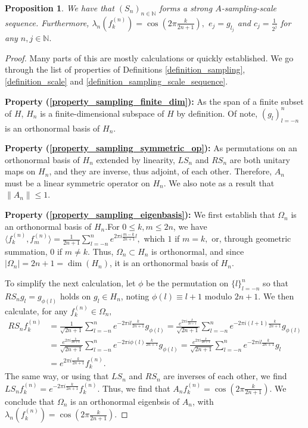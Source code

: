 \documentclass[10pt,a4paper]{amsart}
\newtheorem{prop}[thm]{Proposition}
\def \LL{\langle}
\def \RR{\rangle}
\begin{document}
\begin{prop}\label{proposition_shift_sampling_sequence}
	We have that $(S_n)_{n\in\mathbb{N}}$ forms a strong $A$-sampling-scale sequence. Furthermore, $\lambda_n(f_k^{(n)})=\cos\left(2\pi\frac{k}{2n+1} \right),$ $e_j=g_{l_j}$ and $c_j=\frac{1}{2^j}$ for any $n, j\in\mathbb{N}.$
\end{prop}
\begin{proof}
	Many parts of this are mostly calculations or quickly established. We go through the list of properties of Definitions \ref{definition_sampling}, \ref{definition_scale} and \ref{definition_sampling_scale_sequence}.
	
	\textbf{Property (\ref{property_sampling_finite_dim}):} As the span of a finite subset of $H$, $H_n$ is a finite-dimensional subspace of $H$ by definition. Of note, $(g_l)_{l=-n}^n$ is an orthonormal basis of $H_n$.
	
	\textbf{Property (\ref{property_sampling_symmetric_op}):} As permutations on an orthonormal basis of $H_n$ extended by linearity, $LS_n$ and $RS_n$ are both unitary maps on $H_n$, and they are inverse, thus adjoint, of each other. Therefore, $A_n$ must be a linear symmetric operator on $H_n.$ We also note as a result that $\|A_n\|\leq 1.$
	
	\textbf{Property (\ref{property_sampling_eigenbasis}):} We first establish that $\Omega_n$ is an orthonormal basis of $H_n$.For $0\leq k,m\leq 2n$, we have  $\LL f_k^{(n)}, f_m^{(n)} \RR=\frac{1}{2n+1}\sum_{l=-n}^n e^{2\pi i \frac{m-k}{2n+1}l},$ which $1$ if $m=k,$ or, through geometric summation, $0$ if $m\neq k.$ Thus, $\Omega_n\subset H_n$ is orthonormal, and since $|\Omega_n|=2n+1=\dim(H_n)$, it is an orthonormal basis of $H_n$. 
	
	To simplify the next calculation, let $\phi$ be the permutation on $\{l\}_{l=-n}^n$ so that $RS_n g_l=g_{\phi(l)}$ holds on $g_l\in H_n$, noting $\phi(l)\equiv l+1$ modulo $2n+1$. We then calculate, for any $f_k^{(n)}\in\Omega_n,$
	\begin{align*}
		RS_n f_k^{(n)}&=\frac{1}{\sqrt{2n+1}}\sum_{l=-n}^n e^{-2\pi i l \frac{k}{2n+1}}g_{\phi(l)}=\frac{e^{2\pi i\frac{k}{2n+1}}}{\sqrt{2n+1}}\sum_{l=-n}^n e^{-2\pi i (l+1) \frac{k}{2n+1}}g_{\phi(l)}\\
		&=\frac{e^{2\pi i\frac{k}{2n+1}}}{\sqrt{2n+1}}\sum_{l=-n}^n e^{-2\pi i \phi(l) \frac{k}{2n+1}}g_{\phi(l)}=\frac{e^{2\pi i\frac{k}{2n+1}}}{\sqrt{2n+1}}\sum_{l=-n}^n e^{-2\pi i l \frac{k}{2n+1}}g_{l}\\
		&=e^{2\pi i\frac{k}{2n+1}}f_k^{(n)}.
	\end{align*}
	The same way, or using that $LS_n$ and $RS_n$ are inverses of each other, we find $LS_n f_k^{(n)}=e^{-2\pi i\frac{k}{2n+1}}f_k^{(n)}.$ Thus, we find that $A_n f_k^{(n)}= \cos\left(2\pi\frac{k}{2n+1}\right).$ We conclude that $\Omega_n$ is an orthonormal eigenbsis of $A_n$, with $\lambda_n(f_k^{(n)})=\cos\left(2\pi\frac{k}{2n+1}\right).$
	

\end{proof}
\end{document}
